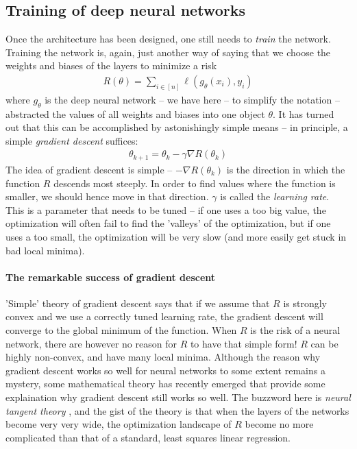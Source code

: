 \documentclass{article}
\begin{document}
\subsection{Training of deep neural networks}
Once the architecture has been designed, one still needs to \emph{train} the network. Training the network is, again, just another way of saying that we choose the weights and biases of the layers to minimize a risk
\begin{align*}
    R(\theta) = \sum_{i \in [n]} \ell(g_\theta(x_i),y_i) 
\end{align*}
where $g_\theta$ is the deep neural network -- we have here -- to simplify the notation --  abstracted the values of all weights and biases into one object $\theta$. It has turned out that this can be accomplished by astonishingly simple means -- in principle, a simple \emph{gradient descent} suffices:
\begin{align*}
    \theta_{k+1} = \theta_k - \gamma \nabla R(\theta_k)
\end{align*}
The idea of gradient descent is simple -- $-\nabla R(\theta_k)$ is the direction in which the function $R$ descends most steeply. In order to find values where the function is smaller, we should hence move in that direction. $\gamma$ is called the \emph{learning rate}. This is a parameter that needs to be tuned -- if one uses a too big value, the optimization will often fail to find the 'valleys' of the optimization, but if one uses a too small, the optimization will be very slow (and more easily get stuck in bad local minima). 


\paragraph{The remarkable success of gradient descent}
'Simple' theory of gradient descent says that if we assume that $R$ is strongly convex and we use a correctly tuned learning rate, the gradient descent will converge to the global minimum of the function. When $R$ is the risk of a neural network, there are however no reason for $R$ to have that simple form! $R$ can be highly non-convex, and have many local minima. Although the reason why gradient descent works so well for neural networks to some extent remains a mystery, some mathematical theory has recently emerged that provide some explaination why gradient descent still works so well. The buzzword here is \emph{neural tangent theory} \cite{jacot2018neural}, and the gist of the theory is that when the layers of the networks become very very wide, the optimization landscape of $R$ become no more complicated than that of a standard, least squares linear regression. 
\end{document}
